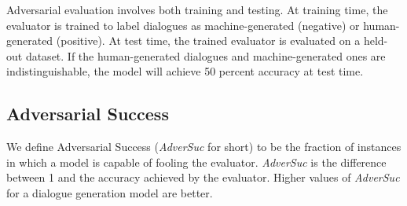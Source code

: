 Adversarial evaluation involves both  training and testing. 
At training time, the evaluator is trained to
label dialogues as machine-generated (negative) or  human-generated (positive). 
At test time, the trained evaluator is evaluated on a held-out dataset.
If the human-generated dialogues and machine-generated ones are indistinguishable, the model  will achieve 50 percent accuracy at test time.  
\subsection{Adversarial Success}
We define Adversarial Success ({\it AdverSuc} for short) to be the fraction of instances in which a model is capable of fooling the evaluator. {\it AdverSuc} is the difference between 1 and the accuracy 
achieved by the  evaluator. Higher values of {\it AdverSuc} for a dialogue generation model are better. 
\begin{comment}
Existing evaluation metrics---e.g., word-overlap metrics such as BLEU and METEOR, or the recently proposed dialogue evaluation metric ADEM \cite{hey}, which learns to predict human evaluation score to input responses---all focus on single turn dialogue quality evaluation. We argue that a dialogue generation model can be more properly evaluated on multi-turn dialogues. 
This is comparable to  the Turing test, in which the human evaluator is asked to chat with the machine for five minutes rather than just a single turn. 
We therefore propose evaluating the model
using multi-turn dialogues generated 
 by having  two bots  talk with each other. 
 \end{comment}
\begin{comment}
We  report {\it AdverSuc} scores
 on dialogues with different numbers of simulated turns (length), specifically, {\it AdverSuc-1}, {\it AdverSuc-2} and {\it AdverSuc-3}, where {\it AdverSuc-N} denotes
the 
{\it AdverSuc} score
 of an evaluator trained on dialogues 
 between the two bots
 simulated for $N$ turns. Theoretically, the larger $N$ is, the easier it is for the discriminator to recognize a machine-generated dialogue and thus the lower the {\it AdverSuc} score should be. 
 \end{comment}
